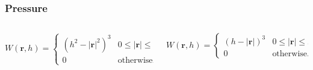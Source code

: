 \documentclass[aspectratio=169]{beamer}
\begin{document}
\begin{frame}
\frametitle{Pressure}
\begin{columns}
\begin{column}{0.45\textwidth}
\[
W\left(\mathbf{r}, h\right) = 
\begin{cases} 
    \left(h^2-\left|\mathbf{r}\right|^2\right)^3 & 0 \leq \left|\mathbf{r}\right| \leq h \\ 
    0 & \text{otherwise.}
\end{cases}
\]
\end{column}
\begin{column}{0.45\textwidth}
\[
W\left(\mathbf{r}, h\right) = 
\begin{cases} 
    \left(h-\left|\mathbf{r}\right|\right)^3 & 0 \leq \left|\mathbf{r}\right| \leq h \\ 
    0 & \text{otherwise.}
\end{cases}
\]
\end{column}
\end{columns}


\end{frame}
\end{document}
